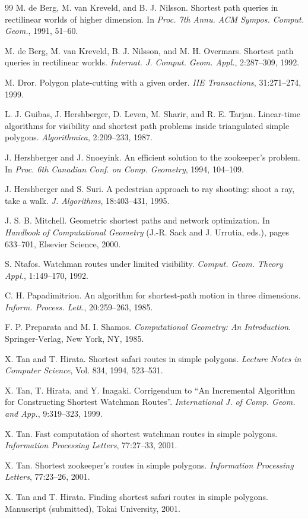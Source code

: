 \documentclass[11pt]{article}
\begin{document}
\begin{thebibliography}{99}
 M. de Berg, M. van Kreveld, and B. J. Nilsson. Shortest path queries in rectilinear worlds of higher dimension. In \emph{Proc. 7th Annu. ACM Sympos. Comput. Geom.}, 1991, 51--60.

 M. de Berg, M. van Kreveld, B. J. Nilsson, and M. H. Overmars. Shortest path queries in rectilinear worlds. \emph{Internat. J. Comput. Geom. Appl.}, 2:287--309, 1992.

 M. Dror. Polygon plate-cutting with a given order. \emph{IIE Transactions}, 31:271--274, 1999.

 L. J. Guibas, J. Hershberger, D. Leven, M. Sharir, and R. E. Tarjan. Linear-time algorithms for visibility and shortest path problems inside triangulated simple polygons. \emph{Algorithmica}, 2:209--233, 1987.

 J. Hershberger and J. Snoeyink. An efficient solution to the zookeeper's problem. In \emph{Proc. 6th Canadian Conf. on Comp. Geometry}, 1994, 104--109.

 J. Hershberger and S. Suri. A pedestrian approach to ray shooting: shoot a ray, take a walk. \emph{J. Algorithms}, 18:403--431, 1995.

 J. S. B. Mitchell. Geometric shortest paths and network optimization. In \emph{Handbook of Computational Geometry} (J.-R. Sack and J. Urrutia, eds.), pages 633--701, Elsevier Science, 2000.

 S. Ntafos. Watchman routes under limited visibility. \emph{Comput. Geom. Theory Appl.}, 1:149--170, 1992.

 C. H. Papadimitriou. An algorithm for shortest-path motion in three dimensions. \emph{Inform. Process. Lett.}, 20:259--263, 1985.

 F. P. Preparata and M. I. Shamos. \emph{Computational Geometry: An Introduction}. Springer-Verlag, New York, NY, 1985.

 X. Tan and T. Hirata. Shortest safari routes in simple polygons. \emph{Lecture Notes in Computer Science}, Vol. 834, 1994, 523--531.

 X. Tan, T. Hirata, and Y. Inagaki. Corrigendum to ``An Incremental Algorithm for Constructing Shortest Watchman Routes''. \emph{International J. of Comp. Geom. and App.}, 9:319--323, 1999.

 X. Tan. Fast computation of shortest watchman routes in simple polygons. \emph{Information Processing Letters}, 77:27--33, 2001.

 X. Tan. Shortest zookeeper's routes in simple polygons. \emph{Information Processing Letters}, 77:23--26, 2001.

 X. Tan and T. Hirata. Finding shortest safari routes in simple polygons. Manuscript (submitted), Tokai University, 2001.

\end{thebibliography}
\end{document}
